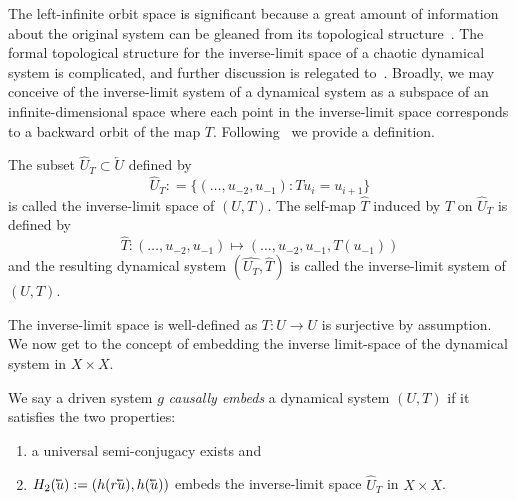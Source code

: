 
The left-infinite orbit space is significant because a great amount of information about the original system can be gleaned from its topological structure~\cite{ingram2011inverse,Manju_IEEE}. 
The formal topological structure for the inverse-limit space of a chaotic dynamical system is complicated, and further discussion is relegated to~\cite{kennedy2008inverse_limit, ingram2011inverse}.
Broadly, we may conceive of the inverse-limit system of a dynamical system as a subspace of an infinite-dimensional space where each point in the inverse-limit space corresponds to a backward orbit of the map $T$. 
Following~\cite{manjunath2021universal, ingram2011inverse} we provide a definition.
\begin{Definition}
  \label{Dfn_InverseL}\rm
 The subset $\widehat{U}_T\subset \overleftarrow{U}$ defined by 
 \begin{equation}
  \widehat{U}_T: = \{ (\ldots,u_{-2},u_{-1}): Tu_{i} = u_{i+1}\}  
 \end{equation}
 is called the inverse-limit space of $(U,T)$.
 The self-map $\widehat{T}$  induced by $T$ on $\widehat{U}_T$  is defined by 
 \begin{equation}
  \widehat{T}: (\ldots,u_{-2},u_{-1}) \mapsto  (\ldots,u_{-2},u_{-1},T(u_{-1}))  
 \end{equation}
 and the resulting dynamical system $(\widehat{U_T}, \widehat{T})$ is called the inverse-limit system of $(U,T)$.
\end{Definition}

The inverse-limit space is well-defined as $T : U \to{U}$ is surjective by assumption.
We now get to the concept of embedding the inverse limit-space of the dynamical system in $X \times X$. 
\begin{Definition}\label{defn_causallyEmbed} \rm
	We say a driven system $g$ \emph{causally embeds} a dynamical system $(U,T)$ if it satisfies the two properties: 
  \vspace{-8mm}
\begin{enumerate}[noitemsep, label=\roman*.]
  \item  a universal semi-conjugacy exists and  
  \item  $H_2(\cev{u}) := (h(r\cev{u}),h(\cev{u}))$ embeds the inverse-limit space $\widehat{U}_T$ in $X \times X$. 
\end{enumerate}
\end{Definition} 
 

